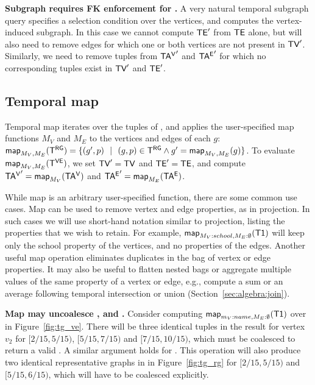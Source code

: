 {\bf Subgraph requires FK enforcement for \tve.}  A very natural
temporal subgraph query specifies a selection condition over the
vertices, and computes the vertex-induced subgraph.  In this case we
cannot compute $\textsf{TE}'$ from $\textsf{TE}$ alone, but will also need to remove
edges for which one or both vertices are not present in $\textsf{TV}'$.
Similarly, we need to remove tuples from $\mathsf{TA^{V}}'$ and $\mathsf{TA^{E}}'$ for which
no corresponding tuples exist in $\textsf{TV}'$ and $\textsf{TE}'$.

\subsection{Temporal map}
\label{sec:algebra:project}

Temporal map iterates over the tuples of \trg, and applies the
user-specified map functions $M_V$ and $M_E$ to the vertices and edges
of each $g$: $\textsf{map}_{M_V,M_E} (\mathsf{T^{RG}}) = \{(g', p)~~|~~(g,p) \in \mathsf{T^{RG}}
\wedge g'= \textsf{map}_{M_V,M_E}(g)\}$.  To evaluate $\textsf{map}_{M_V,M_E} (\mathsf{T^{VE}})$,
we set $\textsf{TV}'=\textsf{TV}$ and $\textsf{TE}'=\textsf{TE}$, and compute $\mathsf{TA^{V}}' =
\textsf{map}_{M_V}(\mathsf{TA^{V}})$ and $\mathsf{TA^{E}}' = \textsf{map}_{M_E}(\mathsf{TA^{E}})$.

While map is an arbitrary user-specified function, there are some
common use cases.  Map can be used to remove vertex and edge
properties, as in projection.  In such cases we will use short-hand
notation similar to projection, listing the properties that we wish to
retain. For example, $\textsf{map}_{M_V:{school},M_E:\emptyset} (\textsf{T1})$
will keep only the school property of the vertices, and no properties
of the edges.  Another useful map operation eliminates duplicates in
the bag of vertex or edge properties.  It may also be
useful to flatten nested bags or aggregate multiple values of the same
property of a vertex or edge, e.g., compute a sum or an average
following temporal intersection or union
(Section~\ref{sec:algebra:join}).

{\bf Map may uncoalesce \tav, \tae and \trg.}  Consider computing
$\textsf{map}_{m_V:name, M_E:\emptyset} (\textsf{T1})$ over  in
Figure~\ref{fig:tg_ve}.  There will be three identical tuples in the
result for vertex $v_2$ for $[2/15, 5/15)$, $[5/15, 7/15)$ and $[7/15,
      10/15)$, which must be coalesced to return a valid \tav.  A
      similar argument holds for \tae. This operation will also
      produce two identical representative graphs in \trg in
      Figure~\ref{fig:tg_rg} for $[2/15, 5/15)$ and $[5/15, 6/15)$,
          which will have to be coalesced explicitly.

